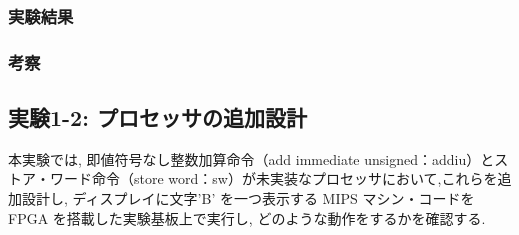 \documentclass[epsf,a4paper,dvipdfmx,autodetect-engine,titlepage]{jsarticle}
\begin{document}
\subsubsection{実験結果}
\subsubsection{考察}

\subsection{実験1-2: プロセッサの追加設計}
本実験では, 即値符号なし整数加算命令（add immediate unsigned：addiu）とストア・ワード命令（store word：sw）が未実装なプロセッサにおいて,これらを追加設計し, ディスプレイに文字’B’ を一つ表示する MIPS マシン・コードをFPGA を搭載した実験基板上で実行し, どのような動作をするかを確認する.
\end{document}
